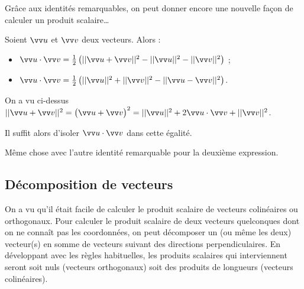 \documentclass[a4paper,11pt]{article}
\begin{document}
\begin{cprop}[s]
Grâce aux identités remarquables, on peut donner encore une nouvelle façon de calculer un produit scalaire\ldots

Soient $\vect{u}$ et $\vect{v}$ deux vecteurs. Alors : 
\begin{itemize}
	\item $\vect{u}\cdot\vect{v}=\tfrac{1}{2}\left(||\vect{u}+\vect{v}||^2-||\vect{u}||^2-||\vect{v}||^2\right)$ ;
	\item $\vect{u}\cdot\vect{v}=\tfrac{1}{2}\left(||\vect{u}||^2+||\vect{v}||^2-||\vect{u}-\vect{v}||^2\right)$.
\end{itemize}
\end{cprop}

\begin{cdemo}
On a vu ci-dessus $||\vect{u}+\vect{v}||^2=\big(\vect{u}+\vect{v}\big)^2=||\vect{u}||^2+2\vect{u}\cdot\vect{v}+||\vect{v}||^2$.

Il suffit alors d'isoler $\vect{u}\cdot\vect{v}$ dans cette égalité.

\smallskip

Même chose avec l'autre identité remarquable pour la deuxième expression.
\end{cdemo}

\subsection{Décomposition de vecteurs}

\begin{cmethode}
On a vu qu'il était facile de calculer le produit scalaire de vecteurs colinéaires ou orthogonaux. Pour calculer le produit scalaire de deux vecteurs quelconques dont on ne connaît pas les coordonnées, on peut décomposer un (ou même les deux) vecteur(s) en somme de vecteurs suivant des directions perpendiculaires. En développant avec les règles habituelles, les produits scalaires qui interviennent seront soit nuls (vecteurs orthogonaux) soit des produits de longueurs (vecteurs colinéaires).
\end{cmethode}
\end{document}
